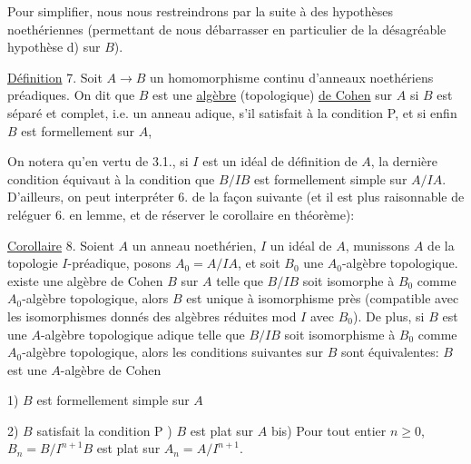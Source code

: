 Pour simplifier, nous nous restreindrons par la suite à des hypothèses
noethériennes (permettant de nous débarrasser en particulier de la désagréable hypothèse d) sur $B$).

\uline{Définition} 7. Soit $A\longrightarrow B$ un homomorphisme continu d'anneaux noethériens
préadiques. On dit que $B$ est une \uline{algèbre} (topologique) \uline{de Cohen} sur $A$
si  $B$ est séparé et complet, i.e.  un anneau adique,
  s'il satisfait à la condition P, et si enfin  $B$ est formellement
  sur $A$, 

On notera qu'en vertu de 3.1., si $I$ est un idéal de définition de $A$,
la dernière condition équivaut à la condition que $B/IB$ est formellement
simple sur $A/IA$. D'ailleurs, on peut interpréter 6. de la façon
suivante (et il est  plus raisonnable de reléguer 6. en lemme,
et de réserver le corollaire en théorème):

\uline{Corollaire} 8. Soient $A$ un anneau  noethérien, $I$ un idéal de $A$,
munissons $A$ de la topologie $I$-préadique, posons $A_0=A/IA$, et soit $B_0$ une
$A_0$-algèbre topologique.  existe une algèbre de Cohen $B$ sur $A$ telle
que $B/IB$ soit isomorphe à $B_0$ comme $A_0$-algèbre topologique,
alors $B$ est unique à  isomorphisme près
 (compatible avec les isomorphismes donnés des algèbres
 réduites mod $I$ avec $B_0$). De plus, si $B$ est une $A$-algèbre topologique adique telle que $B/IB$
soit isomorphisme à $B_0$ comme $A_0$-algèbre topologique, alors les conditions
suivantes sur $B$ sont équivalentes:  $B$ est une $A$-algèbre de Cohen



1) $B$ est formellement simple sur $A$

2) $B$ satisfait la condition P ) $B$ est plat sur $A$  bis) Pour tout
entier $n\geq0$, $B_n=B/I^{n+1}B$ est plat sur $A_n=A/I^{n+1}$. 

